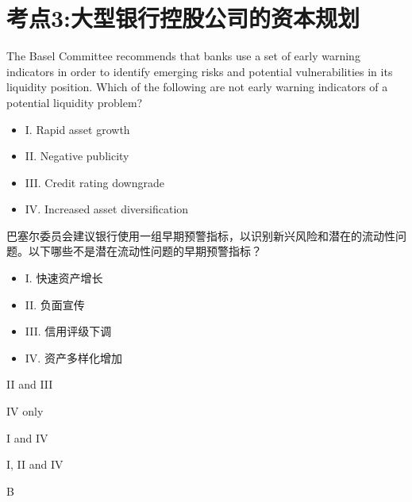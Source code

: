 \documentclass{article}
\newcounter{question} %
\begin{document}
\section{考点3:大型银行控股公司的资本规划}
\setcounter{question}{0}
\begin{question}
    The Basel Committee recommends that banks use a set of early warning indicators in order to identify emerging risks and potential vulnerabilities in its liquidity position. Which of the following are not early warning indicators of a potential liquidity problem?
    \begin{itemize}
    \item I. Rapid asset growth
    \item II. Negative publicity
    \item III. Credit rating downgrade
    \item IV. Increased asset diversification
\end{itemize}
    巴塞尔委员会建议银行使用一组早期预警指标，以识别新兴风险和潜在的流动性问题。以下哪些不是潜在流动性问题的早期预警指标？
    \begin{itemize}
        \item I. 快速资产增长
        \item II. 负面宣传
        \item III. 信用评级下调
        \item IV. 资产多样化增加
    \end{itemize}
\end{question}

\begin{choices}
    \item II and III
    \item IV only
    \item I and IV
    \item I, II and IV
\end{choices}

\begin{correctanswer}
    B
\end{correctanswer}
\end{document}
